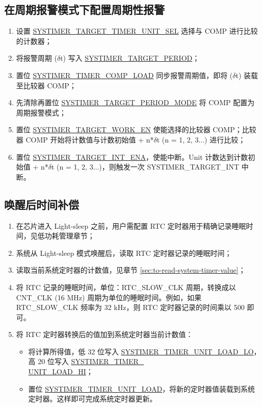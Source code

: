 \documentclass[main\_\_CN.tex]{subfiles}
\begin{document}
\subsection{在周期报警模式下配置周期性报警}
\begin{enumerate}
    \item 设置 \hyperref[fielddesc:SYSTIMERTARGET0TIMERUNITSEL]{SYSTIMER\_TARGET\_TIMER\_UNIT\_SEL} 选择与 COMP 进行比较的计数器；
    \item 将报警周期 ($\delta$t) 写入 \hyperref[fielddesc:SYSTIMERTARGET0PERIOD]{SYSTIMER\_TARGET\_PERIOD}；
    \item 置位 \hyperref[fielddesc:SYSTIMERTIMERCOMP0LOAD]{SYSTIMER\_TIMER\_COMP\_LOAD} 同步报警周期值，即将 ($\delta$t) 装载至比较器 COMP；
    \item 先清除再置位 \hyperref[fielddesc:SYSTIMERTARGET0PERIODMODE]{SYSTIMER\_TARGET\_PERIOD\_MODE} 将 COMP 配置为周期报警模式；
    \item 置位 \hyperref[fielddesc:SYSTIMERTARGET0WORKEN]{SYSTIMER\_TARGET\_WORK\_EN} 使能选择的比较器 COMP；比较器 COMP 开始将计数值与计数初始值 + n*$\delta$t (n = 1, 2, 3...) 进行比较；
    \item 置位 \hyperref[fielddesc:SYSTIMERTARGET0INTENA]{SYSTIMER\_TARGET\_INT\_ENA}，使能中断。Unit 计数达到计数初始值 + n*$\delta$t (n = 1, 2, 3...)，则触发一次 SYSTIMER\_TARGET\_INT 中断。
\end{enumerate}


\subsection{唤醒后时间补偿}
\begin{enumerate}
    \item 在芯片进入 Light-sleep 之前，用户需配置 RTC 定时器用于精确记录睡眠时间，见低功耗管理章节；
    \item 系统从 Light-sleep 模式唤醒后，读取 RTC 定时器记录的睡眠时间；
    \item 读取当前系统定时器的计数值，见章节  \ref{sec:to-read-system-timer-value}；
    \item 将 RTC 记录的睡眠时间，单位：RTC\_SLOW\_CLK 周期，转换成以 CNT\_CLK (16 MHz) 周期为单位的睡眠时间。例如，如果 RTC\_SLOW\_CLK 频率为 32 kHz，则 RTC 定时器记录的时间乘以 500 即可。
    \item 将 RTC 定时器转换后的值加到系统定时器当前计数值：
    \begin{itemize}
        \item 将计算所得值，低 32 位写入 \hyperref[fielddesc:SYSTIMERTIMERUNIT0LOADLO]{SYSTIMER\_TIMER\_UNIT\_LOAD\_LO}，高 20 位写入 \hyperref[fielddesc:SYSTIMERTIMERUNIT0LOADHI]{SYSTIMER\_TIMER\_\\UNIT{}\_LOAD\_HI}；
        \item 置位 \hyperref[fielddesc:SYSTIMERTIMERUNIT0LOAD]{SYSTIMER\_TIMER\_UNIT\_LOAD}，将新的定时器值装载到系统定时器。这样即可完成系统定时器更新。
        \end{itemize}
\end{enumerate}
\end{document}
